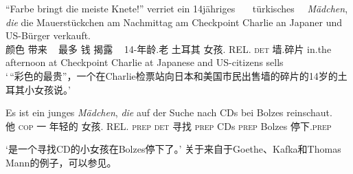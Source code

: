 \eal
\ex 
\gll "`Farbe bringt die meiste Knete!"' verriet ein 14jähriges~~~ türkisches~~ \emph{Mädchen}, \emph{die} die Mauerstückchen am      Nachmittag am Checkpoint Charlie an Japaner und US-Bürger verkauft.\footnotemark\\
颜色 带来 \deter~ 最多 钱 揭露 \deter~ 14-年龄.老  土耳其 女孩.\neu{} REL.\fem{} \textsc{det} 墙.碎片
in.the afternoon at Checkpoint Charlie at Japanese and US-citizens sells\\  
\glt `\,“彩色的最贵”，一个在Charlie检票站向日本和美国市民出售墙的碎片的14岁的土耳其小女孩说。'
\ex 
{\raggedright
\gll Es ist ein junges {\em Mädchen\/}, {\em die\/} auf der Suche nach CDs bei Bolzes reinschaut.\footnotemark\\
	 他 \textsc{cop} 一 年轻的 女孩.\neu{} REL.\fem{} \textsc{prep} \textsc{det} 寻找 \textsc{prep} CDs \textsc{prep} Bolzes 停下.\textsc{prep}\\
\par}
\glt `是一个寻找CD的小女孩在Bolzes停下了。' 
\zl
关于来自于Goethe、Kafka和Thomas Mann的例子，可以参见。

